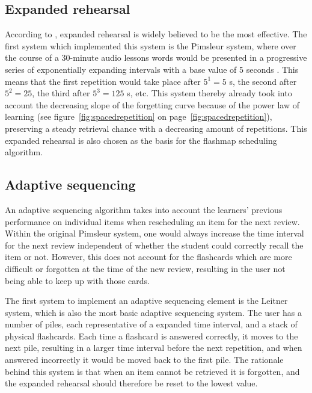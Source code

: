         \subsection{Expanded rehearsal}

According to , expanded rehearsal is widely believed to be the most effective. The first system which implemented this system is the Pimsleur system, where over the course of a 30-minute audio lessons words would be presented in a progressive series of exponentially expanding intervals with a base value of 5 seconds \cite{microlearning}. This means that the first repetition would take place after $5^1=5$ s, the second after $5^2=25$, the third after $5^3=125$ s, etc. This system thereby already took into account the decreasing slope of the forgetting curve because of the power law of learning (see figure~\ref{fig:spacedrepetition} on page~\ref{fig:spacedrepetition}), preserving a steady retrieval chance with a decreasing amount of repetitions. This expanded rehearsal is also chosen as the basis for the flashmap scheduling algorithm.

        \subsection{Adaptive sequencing}

An adaptive sequencing algorithm takes into account the learners' previous performance on individual items when rescheduling an item for the next review. Within the original Pimsleur system, one would always increase the time interval for the next review independent of whether the student could correctly recall the item or not. However, this does not account for the flashcards which are more difficult or forgotten at the time of the new review, resulting in the user not being able to keep up with those cards.

The first system to implement an adaptive sequencing element is the Leitner system, which is also the most basic adaptive sequencing system. The user has a number of piles, each representative of a expanded time interval, and a stack of physical flashcards. Each time a flashcard is answered correctly, it moves to the next pile, resulting in a larger time interval before the next repetition, and when answered incorrectly it would be moved back to the first pile. The rationale behind this system is that when an item cannot be retrieved it is forgotten, and the expanded rehearsal should therefore be reset to the lowest value.

